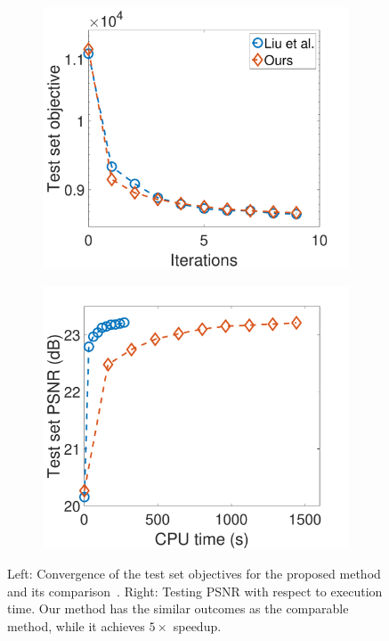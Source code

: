 \begin{figure}[h]
\centering
\begin{subfigure}{0.45\textwidth}
  \includegraphics[width=1\linewidth]{figure/onlineVSliu-ite.pdf}
\end{subfigure} 
\begin{subfigure}{0.45\textwidth}
  \includegraphics[width=1\linewidth]{figure/onlineVSliu-time.pdf}
\end{subfigure}

\caption{Left: Convergence of the test set objectives for the proposed method and its comparison~\cite{liu-2018-first}. Right: Testing PSNR with respect to execution time. Our method has the similar outcomes as the comparable method, while it achieves $5 \times$ speedup. }
\label{fig:onlineSmall}
\end{figure}

